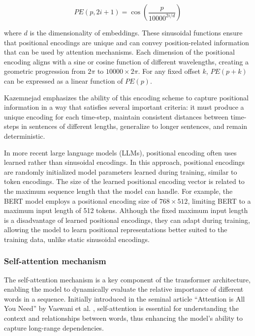 \begin{equation}
    PE(p, 2i + 1) = \cos\left(\frac{p}{10000^{2i/d}}\right)
\end{equation}

where \( d \) is the dimensionality of embeddings. These sinusoidal functions ensure that positional encodings are unique and can convey position-related information that can be used by attention mechanisms. Each dimension of the positional encoding aligns with a sine or cosine function of different wavelengths, creating a geometric progression from \( 2\pi \) to \( 10000 \times 2\pi \). For any fixed offset \( k \), \( PE(p+k) \) can be expressed as a linear function of \( PE(p) \).

Kazemnejad \cite{kazemnejad2019:pencoding} emphasizes the ability of this encoding scheme to capture positional information in a way that satisfies several important criteria: it must produce a unique encoding for each time-step, maintain consistent distances between time-steps in sentences of different lengths, generalize to longer sentences, and remain deterministic.

In more recent large language models (LLMs), positional encoding often uses learned rather than sinusoidal encodings. In this approach, positional encodings are randomly initialized model parameters learned during training, similar to token encodings. The size of the learned positional encoding vector is related to the maximum sequence length that the model can handle. For example, the BERT model \cite{devlin2018bert} employs a positional encoding size of \( 768 \times 512 \), limiting BERT to a maximum input length of 512 tokens. Although the fixed maximum input length is a disadvantage of learned positional encodings, they can adapt during training, allowing the model to learn positional representations better suited to the training data, unlike static sinusoidal encodings.

\subsubsection{Self-attention mechanism}

The self-attention mechanism is a key component of the transformer architecture, enabling the model to dynamically evaluate the relative importance of different words in a sequence. Initially introduced in the seminal article “Attention is All You Need” by Vaswani et al. \cite{vaswani2017attention}, self-attention is essential for understanding the context and relationships between words, thus enhancing the model's ability to capture long-range dependencies.

